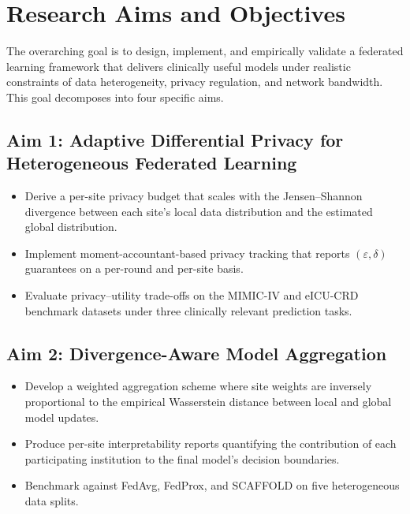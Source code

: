 \section{Research Aims and Objectives}

The overarching goal is to design, implement, and empirically validate a federated learning
framework that delivers clinically useful models under realistic constraints of data
heterogeneity, privacy regulation, and network bandwidth. This goal decomposes into four
specific aims.

\subsection{Aim 1: Adaptive Differential Privacy for Heterogeneous Federated Learning}
\vspace{-2pt}
\begin{itemize}
  \item Derive a per-site privacy budget that scales with the Jensen--Shannon divergence
    between each site's local data distribution and the estimated global distribution.
  \item Implement moment-accountant-based privacy tracking that reports $(\varepsilon,\delta)$
    guarantees on a per-round and per-site basis.
  \item Evaluate privacy--utility trade-offs on the MIMIC-IV and eICU-CRD benchmark datasets
    under three clinically relevant prediction tasks.
\end{itemize}

\subsection{Aim 2: Divergence-Aware Model Aggregation}
\vspace{-2pt}
\begin{itemize}
  \item Develop a weighted aggregation scheme where site weights are inversely proportional
    to the empirical Wasserstein distance between local and global model updates.
  \item Produce per-site interpretability reports quantifying the contribution of each
    participating institution to the final model's decision boundaries.
  \item Benchmark against FedAvg, FedProx, and SCAFFOLD on five heterogeneous data splits.
\end{itemize}

